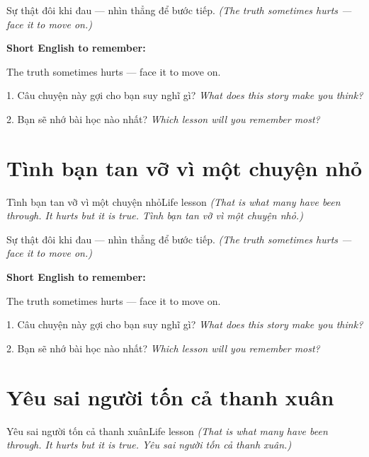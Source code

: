\begin{baihoc}
Sự thật đôi khi đau — nhìn thẳng để bước tiếp.
\textit{(The truth sometimes hurts — face it to move on.)}
\end{baihoc}

\begin{ghinhoanh}
\textbf{Short English to remember:}

The truth sometimes hurts — face it to move on.

\end{ghinhoanh}

\begin{tuhocnhanh}
1. Câu chuyện này gợi cho bạn suy nghĩ gì? \textit{What does this story make you think?}

2. Bạn sẽ nhớ bài học nào nhất? \textit{Which lesson will you remember most?}
\end{tuhocnhanh}
\ngancach


\section{Tình bạn tan vỡ vì một chuyện nhỏ}
\begin{truyen}{Tình bạn tan vỡ vì một chuyện nhỏ}{Life lesson}
\textit{(That is what many have been through. It hurts but it is true. Tình bạn tan vỡ vì một chuyện nhỏ.)}
\end{truyen}

\begin{baihoc}
Sự thật đôi khi đau — nhìn thẳng để bước tiếp.
\textit{(The truth sometimes hurts — face it to move on.)}
\end{baihoc}

\begin{ghinhoanh}
\textbf{Short English to remember:}

The truth sometimes hurts — face it to move on.

\end{ghinhoanh}

\begin{tuhocnhanh}
1. Câu chuyện này gợi cho bạn suy nghĩ gì? \textit{What does this story make you think?}

2. Bạn sẽ nhớ bài học nào nhất? \textit{Which lesson will you remember most?}
\end{tuhocnhanh}
\ngancach


\section{Yêu sai người tốn cả thanh xuân}
\begin{truyen}{Yêu sai người tốn cả thanh xuân}{Life lesson}
\textit{(That is what many have been through. It hurts but it is true. Yêu sai người tốn cả thanh xuân.)}
\end{truyen}

